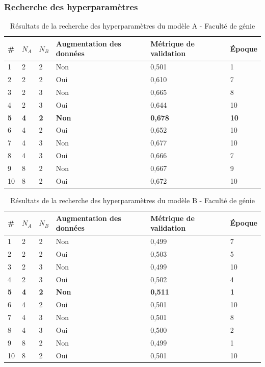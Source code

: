 \subsubsection{Recherche des hyperparamètres}
    \begin{table}[H]
        \centering
        \caption{Résultats de la recherche des hyperparamètres du modèle A - Faculté de génie}
        \label{tab:resultat_corridor_modele_a}
        \begin{tabular}{lllp{3cm}p{3cm}l}
            \midrule
            \# & \(N_A\) & \(N_B\) & Augmentation des données & Métrique de validation & Époque\\
            \midrule\midrule
            1  & 2 & 2 & Non & 0,501 & 1\\
            2  & 2 & 2 & Oui & 0,610 & 7\\
            3  & 2 & 3 & Non & 0,665 & 8\\
            4  & 2 & 3 & Oui & 0,644 & 10\\
            \textbf{5}  & \textbf{4} & \textbf{2} & \textbf{Non} & \textbf{0,678} & \textbf{10}\\
            6  & 4 & 2 & Oui & 0,652 & 10\\
            7  & 4 & 3 & Non & 0,677 & 10\\
            8  & 4 & 3 & Oui & 0,666 & 7\\
            9  & 8 & 2 & Non & 0,667 & 9\\
            10 & 8 & 2 & Oui & 0,672 & 10\\
            \midrule
        \end{tabular}
    \end{table}
    
    \begin{table}[H]
        \centering
        \caption{Résultats de la recherche des hyperparamètres du modèle B - Faculté de génie}
        \label{tab:resultat_corridor_modele_b}
        \begin{tabular}{lllp{3cm}p{3cm}l}
            \midrule
            \# & \(N_A\) & \(N_B\) & Augmentation des données & Métrique de validation & Époque\\
            \midrule\midrule
            1  & 2 & 2 & Non & 0,499 & 7\\
            2  & 2 & 2 & Oui & 0,503 & 5\\
            3  & 2 & 3 & Non & 0,499 & 10\\
            4  & 2 & 3 & Oui & 0,502 & 4\\
            \textbf{5}  & \textbf{4} & \textbf{2} & \textbf{Non} & \textbf{0,511} & \textbf{1}\\
            6  & 4 & 2 & Oui & 0,501 & 10\\
            7  & 4 & 3 & Non & 0,501 & 8\\
            8  & 4 & 3 & Oui & 0,500 & 2\\
            9  & 8 & 2 & Non & 0,499 & 1\\
            10 & 8 & 2 & Oui & 0,501 & 10\\
            \midrule
        \end{tabular}
    \end{table}
    
